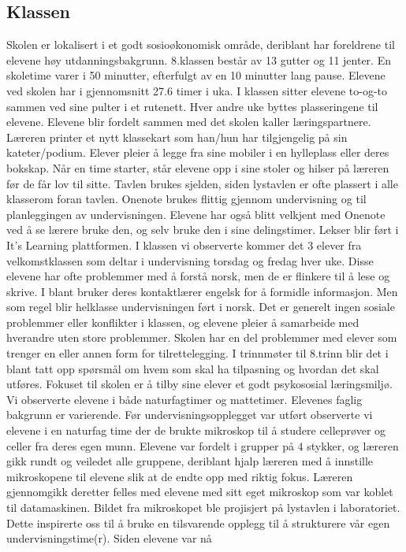 \documentclass[main.tex]{subfiles}
\begin{document}
\subsection*{Klassen}
Skolen er lokalisert i et godt sosioøkonomisk område, deriblant har foreldrene til elevene høy utdanningsbakgrunn. 8.klassen består av 13 gutter og 11 jenter. En skoletime varer i 50 minutter, efterfulgt av en 10 minutter lang pause. Elevene ved skolen har i gjennomsnitt 27.6 timer i uka. I klassen sitter elevene to-og-to sammen ved sine pulter i et rutenett. Hver andre uke byttes plasseringene til elevene. Elevene blir fordelt sammen med det skolen kaller læringspartnere. Læreren printer et nytt klassekart som han/hun har tilgjengelig på sin kateter/podium. Elever pleier å legge fra sine mobiler i en hylleplass eller deres bokskap. Når en time starter, står elevene opp i sine stoler og hilser på læreren før de får lov til sitte. Tavlen brukes sjelden, siden lystavlen er ofte plassert i alle klasserom foran tavlen. Onenote brukes flittig gjennom undervisning og til planleggingen av undervisningen. Elevene har også blitt velkjent med Onenote ved å se lærere bruke den, og selv bruke den i sine delingstimer. Lekser blir ført i It’s Learning plattformen. I klassen vi observerte kommer det 3 elever fra velkomstklassen som deltar i undervisning torsdag og fredag hver uke. Disse elevene har ofte problemmer med å forstå norsk, men de er flinkere til å lese og skrive. I blant bruker deres kontaktlærer engelsk for å formidle informasjon. Men som regel blir helklasse undervisningen ført i norsk. Det er generelt ingen sosiale problemmer eller konflikter i klassen, og elevene pleier å samarbeide med hverandre uten store problemmer. Skolen har en del problemmer med elever som trenger en eller annen form for tilrettelegging. I trinnmøter til 8.trinn blir det i blant tatt opp spørsmål om hvem som skal ha tilpasning og hvordan det skal utføres. Fokuset til skolen er å tilby sine elever et godt psykososial læringsmiljø.
\newline
Vi observerte elevene i både naturfagtimer og mattetimer. Elevenes faglig bakgrunn er varierende. Før 
undervisningsopplegget var utført observerte vi elevene i en naturfag time der de brukte mikroskop til å studere 
celleprøver og celler fra deres egen munn. Elevene var fordelt i grupper på 4 stykker, og læreren gikk rundt og 
veiledet alle gruppene, deriblant hjalp læreren med å innstille mikroskopene til elevene slik at de endte opp med
riktig fokus. Læreren gjennomgikk deretter felles med elevene med sitt eget mikroskop
som var koblet til datamaskinen. Bildet fra mikroskopet ble projisjert på lystavlen i laboratoriet. Dette inspirerte 
oss til å bruke en tilsvarende opplegg til å strukturere vår egen undervisningstime(r). Siden elevene var nå
\end{document}
